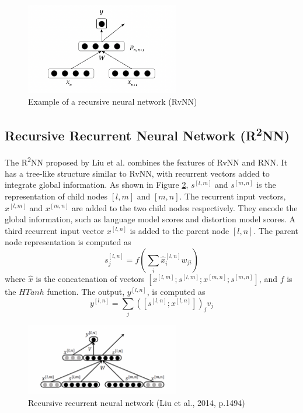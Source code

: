 \documentclass[12pt,a4paper,twoside,openright]{report}
\begin{document}
\begin{figure}[ht]
\centering
\includegraphics[width=0.6\textwidth]{images/rvnn.png}
\caption{Example of a recursive neural network (RvNN)}
\label{fig:rvnn}
\end{figure}


\subsection{\texorpdfstring{Recursive Recurrent Neural Network (R\textsuperscript{2}NN)}{Recursive Recurrent Neural Network (R2NN)}}
The R\textsuperscript{2}NN proposed by Liu et al.\cite{r2nn} combines the features of RvNN and RNN. It has a tree-like structure similar to RvNN, with recurrent vectors added to integrate global information. As shown in Figure \ref{fig:r2nn}, $s^{[l, m]}$ and $s^{[m, n]}$ is the representation of child nodes $[l, m]$ and $[m, n]$. The recurrent input vectors, $x^{[l, m]}$ and $x^{[m, n]}$ are added to the two child nodes respectively. They encode the global information, such as language model scores and distortion model scores. A third recurrent input vector $x^{[l, n]}$ is added to the parent node $[l, n]$. The parent node representation is computed as
\[ s_j^{[l, n]} = f(\sum_{i} \hat{x}_i^{[l, n]}w_{ji}) \]
where $\hat{x}$ is the concatenation of vectors $[x^{[l, m]}; s^{[l, m]}; x^{[m, n]}; s^{[m, n]}]$, and $f$ is the $HTanh$ function. The output, $y^{[l, n]}$, is computed as
\[ y^{[l, n]} = \sum_{j} ([s^{[l, n]}; x^{[l, n]}])_{j}v_j \]


\begin{figure}[ht]
\centering
\includegraphics[width=0.6\textwidth]{images/r2nn.png}
\caption{Recursive recurrent neural network (Liu et al., 2014, p.1494)}
\label{fig:r2nn}
\end{figure}
\end{document}
